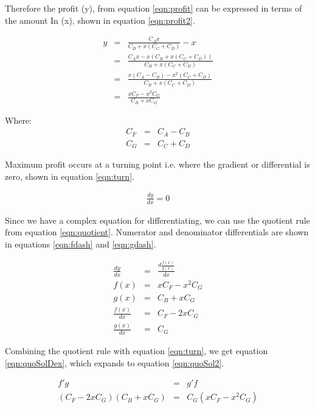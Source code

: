 \documentclass[runningheads]{llncs}
\begin{document}
Therefore the profit (y), from equation \ref{eqn:profit} can be expressed in terms of the amount In (x), shown in equation \ref{eqn:profit2}.

\begin{eqnarray}
	y  &=& \frac{C_{A} x}{C_{B} + x(C_{C} + C_{D})} - x \label{eqn:profit2}\\
	&=& \frac{C_{A} x - x(C_{B} + x(C_{C} + C_{D}))}{C_{B} + x(C_{C} + C_{D})} \label{eqn:profit3}\\
	&=& \frac{x(C_{A} - C_{B}) - x^2(C_{C} + C_{D})}{C_{B} + x(C_{C} + C_{D})} \label{eqn:profit4}\\
	&=& \frac{x C_{F} - x^2 C_{G} }{C_{B} + x C_{G}} \label{eqn:profit5}
\end{eqnarray}

Where:
\begin{eqnarray}
	C_{F}  &=& C_{A} - C_{B}\\
	C_{G}  &=& C_{C} + C_{D}
\end{eqnarray}

Maximum profit occurs at a turning point i.e. where the gradient or differential is zero, shown in equation \ref{eqn:turn}.

\begin{eqnarray}
	\frac{dy}{dx} = 0 \label{eqn:turn}
\end{eqnarray}

Since we have a complex equation for differentiating, we can use the quotient rule from equation \ref{eqn:quotient}. Numerator and denominator differentials are shown in equations \ref{eqn:fdash} and \ref{eqn:gdash}.

\begin{eqnarray}
	\frac{dy}{dx} &=& \frac{d \frac{ f(x)}{g(x)}}{dx} \label{eqn:turn2}\\
	f(x) &=& x C_{F} - x^2 C_{G} \label{eqn:f}\\
	g(x) &=& C_{B} + x C_{G} \label{eqn:g}\\
	\frac{f(x)}{dx} &=& C_{F} - 2 x C_{G} \label{eqn:fdash}\\
	\frac{g(x)}{dx} &=& C_{G} \label{eqn:gdash}
\end{eqnarray}

Combining the quotient rule with equation \ref{eqn:turn}, we get equation \ref{eqn:quoSolDex}, which expands to equation \ref{eqn:quoSol2}.

\begin{eqnarray}
	f'g &=& g'f \label{eqn:quoSolDex}\\
	(C_{F} - 2 x C_{G})(C_{B} + x C_{G}) &=& C_{G} ( x C_{F} - x^2 C_{G}) \label{eqn:quoSol2}
\end{eqnarray}
\end{document}
